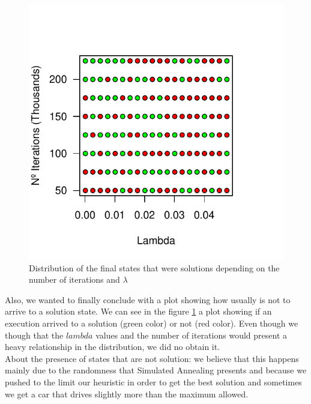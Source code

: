 \documentclass[12]{article}
\begin{document}
    
    \begin{figure}[H]
    \captionsetup{justification=centering}
     \centering
      \includegraphics[scale=0.8]{Results/data_B_4.pdf}
        \caption{Distribution of the final states that were solutions depending on the number of iterations and $\lambda$}
        \label{fig:data5}
    \end{figure}
      \vspace{1cm}
Also, we wanted to finally conclude with a plot showing how usually is not to arrive to a solution state. We can see in the figure \ref{fig:data5} a plot showing if an execution arrived to a solution (green color) or not (red color). Even though we though that the $lambda$ values and the number of iterations would present a heavy relationship in the distribution, we did no obtain it. 
 \\
 \medskip
About the presence of states that are not solution: we believe that this happens mainly due to the randomness that Simulated Annealing presents and because we pushed to the limit our heuristic in order to get the best solution and sometimes we get a car that drives slightly more than the maximum allowed. 
\end{document}
